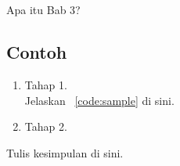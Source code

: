 \chapter{\babTiga}
Apa itu Bab 3?


\section{Contoh}
\begin{enumerate}
	\item Tahap 1. \\ 
	Jelaskan \lst~\ref{code:sample} di sini.

	\item Tahap 2.
\end{enumerate}

Tulis kesimpulan di sini.
